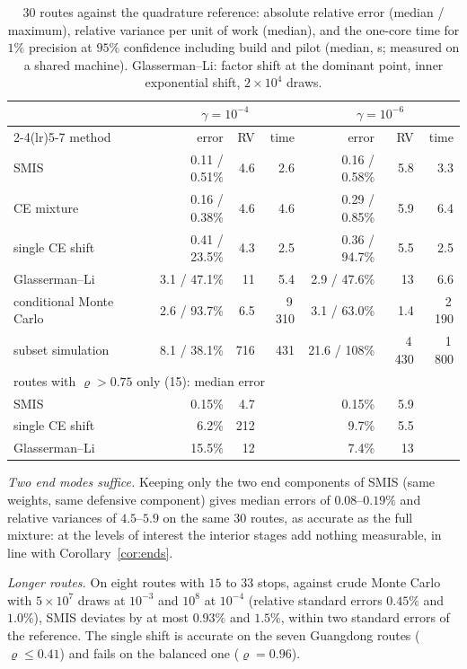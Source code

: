 \documentclass[pdflatex,sn-mathphys-ay]{sn-jnl}%
\theoremstyle{thmstyleone}%
\theoremstyle{thmstylethree}%
\theoremstyle{thmstyletwo}%
\begin{document}
\begin{table}[t]
\centering\small
\caption{30 routes against the quadrature reference: absolute relative error (median /
maximum), relative variance per unit of work (median), and the one-core time for $1\%$
precision at $95\%$ confidence including build and pilot (median, s; measured on a shared
machine). Glasserman--Li: factor shift at the dominant point, inner exponential shift,
$2\times10^4$ draws.}
\label{tab:rivals}
\begin{tabular}{lrrrrrr}
\toprule
 & \multicolumn{3}{c}{$\gamma=10^{-4}$} & \multicolumn{3}{c}{$\gamma=10^{-6}$} \\
\cmidrule(lr){2-4}\cmidrule(lr){5-7}
method & error & RV & time & error & RV & time \\
\midrule
SMIS & 0.11 / 0.51\% & 4.6 & 2.6 & 0.16 / 0.58\% & 5.8 & 3.3 \\
CE mixture & 0.16 / 0.38\% & 4.6 & 4.6 & 0.29 / 0.85\% & 5.9 & 6.4 \\
single CE shift & 0.41 / 23.5\% & 4.3 & 2.5 & 0.36 / 94.7\% & 5.5 & 2.5 \\
Glasserman--Li & 3.1 / 47.1\% & 11 & 5.4 & 2.9 / 47.6\% & 13 & 6.6 \\
conditional Monte Carlo & 2.6 / 93.7\% & 6.5 & 9\,310 & 3.1 / 63.0\% & 1.4 & 2\,190 \\
subset simulation & 8.1 / 38.1\% & 716 & 431 & 21.6 / 108\% & 4\,430 & 1\,800 \\
\midrule
\multicolumn{7}{l}{routes with $\varrho>0.75$ only (15): median error} \\
SMIS & 0.15\% & 4.7 & & 0.15\% & 5.9 & \\
single CE shift & 6.2\% & 212 & & 9.7\% & 5.5 & \\
Glasserman--Li & 15.5\% & 12 & & 7.4\% & 13 & \\
\bottomrule
\end{tabular}
\end{table}

\emph{Two end modes suffice.} Keeping only the two end components of SMIS (same weights,
same defensive component) gives median errors of $0.08$--$0.19\%$ and relative variances
of $4.5$--$5.9$ on the same 30 routes, as accurate as the full mixture: at the levels of
interest the interior stages add nothing measurable, in line with
Corollary~\ref{cor:ends}.

\emph{Longer routes.} On eight routes with $15$ to $33$ stops, against crude Monte Carlo
with $5\times10^7$ draws at $10^{-3}$ and $10^8$ at $10^{-4}$ (relative standard errors
$0.45\%$ and $1.0\%$), SMIS deviates by at most $0.93\%$ and $1.5\%$, within two standard
errors of the reference. The single shift is accurate on the seven Guangdong routes
($\varrho\le0.41$) and fails on the balanced one ($\varrho=0.96$).
\end{document}

